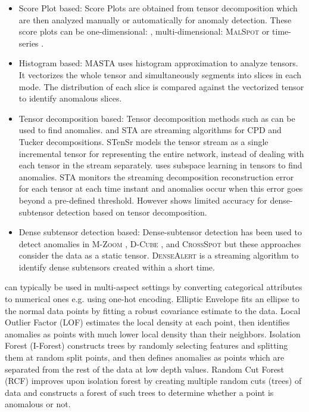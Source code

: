 \documentclass[sigconf]{acmart}
\begin{document}
\begin{itemize}
\item Score Plot based: Score Plots are obtained from tensor decomposition which are then analyzed manually or automatically for anomaly detection. These score plots can be one-dimensional: \cite{papalexakis2014spotting}, multi-dimensional: \textsc{MalSpot} \cite{mao2014malspot} or time-series  \cite{papalexakis2012parcube}.

\item Histogram based: MASTA \cite{fanaee2015multi} uses histogram approximation to analyze tensors. It vectorizes the whole tensor and simultaneously segments into slices in each mode.
The distribution of each slice is compared against the vectorized tensor to identify anomalous slices.

\item Tensor decomposition based:
Tensor decomposition methods such as \cite{kolda2009tensor} can be used to find anomalies. \cite{zhou2016accelerating} and STA \cite{sun2006beyond} are streaming algorithms for CPD and Tucker decompositions.  STenSr \cite{shi2015stensr} models the tensor stream as a single incremental tensor for representing the entire network, instead of dealing with each tensor in the stream separately. \cite{li2011robust} uses subspace learning in tensors to find anomalies. STA monitors the streaming decomposition reconstruction error for each tensor at each time instant and anomalies occur when this error goes beyond a pre-defined threshold. However \cite{shin2017densealert} shows limited accuracy for dense-subtensor detection based on tensor decomposition.

\item Dense subtensor detection based:
Dense-subtensor detection has been used to detect anomalies in \textsc{M-Zoom} \cite{shin2016m}, \textsc{D-Cube} \cite{shin2017d}, \cite{maruhashi2011multiaspectforensics} and \textsc{CrossSpot} \cite{jiang2015general} but these approaches consider the data as a static tensor. \textsc{DenseAlert} \cite{shin2017densealert} is a streaming algorithm to identify dense subtensors created within a short time.


\end{itemize}



 can typically be used in multi-aspect settings by converting categorical attributes to numerical ones e.g. using one-hot encoding. Elliptic Envelope \cite{rousseeuw1999fast} fits an ellipse to the normal data points by fitting a robust covariance estimate to the data. Local Outlier Factor (LOF) \cite{breunig2000lof} estimates the local density at each point, then identifies anomalies as points with much lower local density than their neighbors. Isolation Forest (I-Forest) \cite{liu2008isolation} constructs trees by randomly selecting features and splitting them at random split points, and then defines anomalies as points which are separated from the rest of the data at low depth values. Random Cut Forest (RCF) \cite{guha2016robust} improves upon isolation forest by creating multiple random cuts (trees) of data and constructs a forest of such trees to determine whether a point is anomalous or not.
\end{document}
